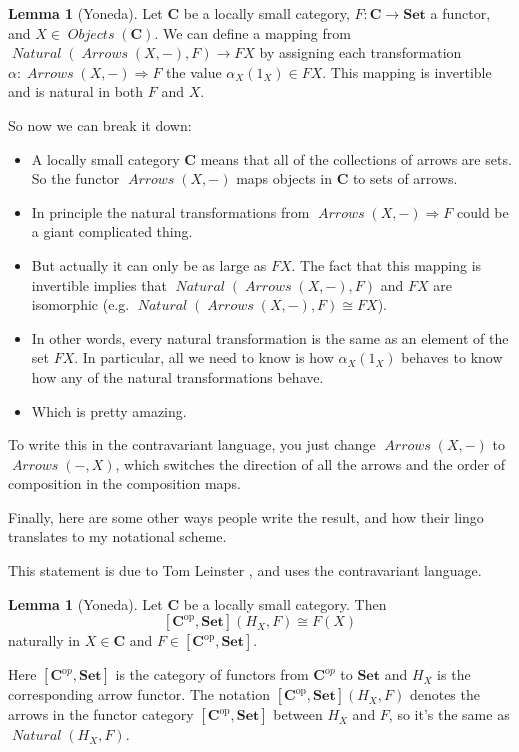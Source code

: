 \documentclass[12pt]{article}
\theoremstyle{definition}
\newtheorem{lemma}[thm]{Lemma}
\theoremstyle{definition}
\theoremstyle{definition}
\numberwithin{equation}{section}
\newcommand{\h}{H}                      %
\newcommand{\op}{\mathrm{op}}           %
\newcommand{\ftrcat}[2]{[#1,#2]}                %
\newcommand{\pshf}[1]{\ftrcat{#1^\op}{\Set}}    %
\newcommand{\cat}[1]{\mathbf{#1}}      %
\newcommand{\fcat}[1]{{\mathbf {#1}}}    %
\newcommand{\CC}{\cat{C}}
\newcommand{\CCop}{\cat{C}^{\mathrm op}}
\DeclareMathOperator{\Arrows}{\mathit{Arrows}}
\DeclareMathOperator{\Objects}{\mathit{Objects}}
\DeclareMathOperator{\Nat}{\mathit{Natural}}
\def\objc{\Objects(\cat{C})}
\newcommand{\Set}{\fcat{Set}}           %
\newcommand{\iso}{\cong}                %
\newcommand{\fto}{\Rightarrow}
\def\pg{\bigskip\goodbreak
\ni}
\def\ni{\goodbreak\noindent}
\begin{document}
\begin{lemma}[Yoneda]\label{yoneda} Let $\CC$ be a locally small category, $F:\CC \to \Set$ a functor,
and $X \in \objc$. We can define a mapping from $\Nat(\Arrows(X, -),F) \to FX$
by assigning each transformation $\alpha: \Arrows(X, -) \fto F$ 
the value $\alpha_X(1_X) \in FX$. 
This mapping is invertible and is natural in both $F$ and $X$.
\end{lemma}
\ni
So now we can break it down:
\begin{itemize}
\item A locally small category $\CC$ means that all of the collections of arrows are sets.
So the functor $\Arrows(X,-)$ maps objects in $\CC$ to sets of arrows.
\item In principle the natural transformations 
from $\Arrows(X, -) \fto F$ could be a giant complicated thing.
\item But actually it can only be as large as $FX$. The fact that this mapping is
invertible implies
that $\Nat(\Arrows(X, -),F)$ and  $FX$ are isomorphic (e.g. $\Nat(\Arrows(X, -),F) \iso FX$).
\item In other words, every natural transformation is the same as
an element of the set $FX$. In particular, all we need to know is how 
$\alpha_X(1_X)$ behaves to know
how any of the natural transformations behave.
\item Which is pretty amazing.
\end{itemize}
To write this in the contravariant language, you just change $\Arrows(X, -)$ to $\Arrows(-, X)$, which
switches the direction of all the arrows and the order of composition in the composition maps.

\pg
Finally, here are some other ways people write the result, and how their lingo translates to 
my notational scheme.

\pg
This statement is due to Tom Leinster \cite{Leinster}, and uses the contravariant language.

\begin{lemma}[Yoneda]   
\label{yoneda-leinster}
Let $\CC$ be a locally small category.  Then
%
$$
\pshf{\CC}(\h_X, F)
\iso
F(X)
$$
%
naturally in $X \in \CC$ and $F \in \pshf{\CC}$.  
\end{lemma}
\ni
Here $[\CCop, \Set]$ is the category of functors from $\CCop$ to $\Set$ and $\h_X$ is the corresponding
arrow functor. The notation $\pshf{\CC}(\h_X, F)$ denotes the arrows in the functor category $\pshf{\CC}$ between 
$\h_X$ and $F$, so it's the same as $\Nat(\h_X, F)$.
\end{document}
